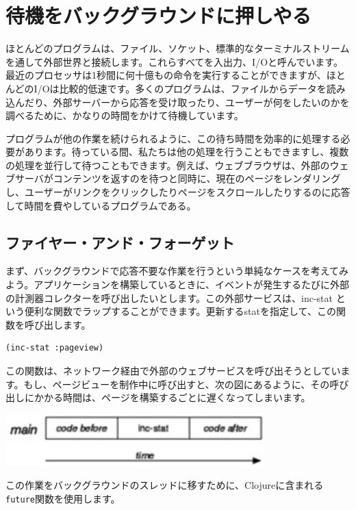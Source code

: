 \section{待機をバックグラウンドに押しやる}

ほとんどのプログラムは、ファイル、ソケット、標準的なターミナルストリームを通して外部世界と接続します。これらすべてを入出力、I/Oと呼んでいます。最近のプロセッサは1秒間に何十億もの命令を実行することができますが、ほとんどのI/Oは比較的低速です。多くのプログラムは、ファイルからデータを読み込んだり、外部サーバーから応答を受け取ったり、ユーザーが何をしたいのかを調べるために、かなりの時間をかけて待機しています。

プログラムが他の作業を続けられるように、この待ち時間を効率的に処理する必要があります。待っている間、私たちは他の処理を行うこともできますし、複数の処理を並行して待つこともできます。例えば、ウェブブラウザは、外部のウェブサーバがコンテンツを返すのを待つと同時に、現在のページをレンダリングし、ユーザーがリンクをクリックしたりページをスクロールしたりするのに応答して時間を費やしているプログラムである。

\subsection{ファイヤー・アンド・フォーゲット}

まず、バックグラウンドで応答不要な作業を行うという単純なケースを考えてみよう。アプリケーションを構築しているときに、イベントが発生するたびに外部の計測器コレクターを呼び出したいとします。この外部サービスは、inc-stat という便利な関数でラップすることができます。更新するstatを指定して、この関数を呼び出します。


\begin{lstlisting}[numbers=none]
(inc-stat :pageview)
\end{lstlisting}

この関数は、ネットワーク経由で外部のウェブサービスを呼び出そうとしています。もし、ページビューを制作中に呼び出すと、次の図にあるように、その呼び出しにかかる時間は、ページを構築するごとに遅くなってしまいます。


\includegraphics[width=10cm]{fig_05_001.eps}

この作業をバックグラウンドのスレッドに移すために、Clojureに含まれる\texttt{future}関数を使用します。

